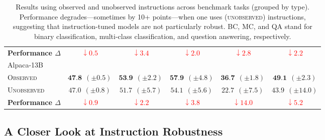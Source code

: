 \begin{table*}[h]
\begin{tabular}{l c c c c c}
    \hspace{0.25cm} \textbf{Performance $\Delta$} & \textcolor{red}{$\downarrow 0.5$}       & \textcolor{red}{$\downarrow 3.4$}       & \textcolor{red}{$\downarrow 2.0$}  & \textcolor{red}{$\downarrow 2.8$}  & \textcolor{red}{$\downarrow 2.2$} \\
    \rule{0pt}{12pt} Alpaca-13B                   &                                         &                                         &                                    &                                                                        \\
    \hspace{0.25cm} \textsc{Observed}             & $\textbf{47.8} \ \ (\pm 0.5)$           & $\textbf{53.9} \ \ (\pm 2.2)$           & $\textbf{57.9} \ \ (\pm 4.8)$      & $\textbf{36.7} \ \ (\pm 1.8)$      & $\textbf{49.1} \ \ (\pm 2.3)$     \\
    \hspace{0.25cm} \textsc{Unobserved}           & $47.0 \ \ (\pm 0.8)$                    & $51.7 \ \ (\pm 5.7)$                    & $54.1 \ \ (\pm 5.6)$               & $22.7 \ \ (\pm 7.5)$               & $43.9 \ \ (\pm 14.0)$             \\
    \hspace{0.25cm} \textbf{Performance $\Delta$} & \textcolor{red}{$\downarrow 0.9$}       & \textcolor{red}{$\downarrow 2.2$}       & \textcolor{red}{$\downarrow 3.8$}  & \textcolor{red}{$\downarrow 14.0$} & \textcolor{red}{$\downarrow 5.2$} \\
    \bottomrule
  \end{tabular}
  \vspace{0.25cm}
  \caption{Results using observed and unobserved instructions across benchmark tasks (grouped by type). Performance degrades---sometimes by 10+ points---when one uses (\textsc{unobserved}) instructions, suggesting that instruction-tuned models are not particularly robust. BC, MC, and QA stand for binary classification, multi-class classification, and question answering, respectively.} %
  \label{tab:main_result}
\end{table*}

\subsection{A Closer Look at Instruction Robustness}
\label{section:closer-look}

